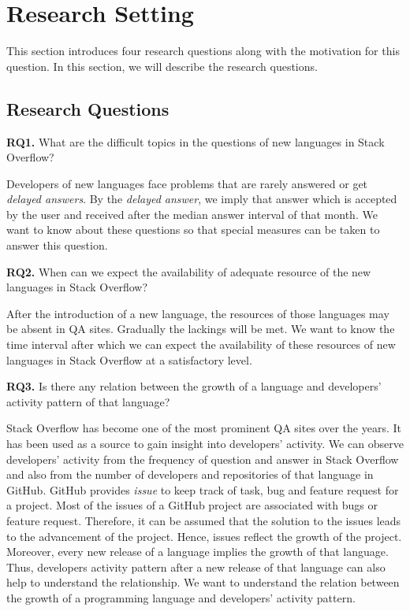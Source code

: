 \section{Research Setting}
\label{sec:Research Setting}
This section introduces four research questions along with the motivation for this question. In this section, we will describe the research questions.

\subsection{Research Questions}
\noindent \textbf{RQ1.} What are the difficult topics in the questions of new languages in Stack Overflow?

\indent  Developers of new languages face problems that are rarely answered or get \emph{delayed answers}. By the \emph{delayed answer}, we imply that answer which is accepted by the user and received after the median answer interval of that month. We want to know about these questions so that special measures can be taken to answer this question.

\noindent  \textbf{RQ2.} When can we expect the availability of adequate resource of the new languages in Stack Overflow?

\indent After the introduction of a new language, the resources of those languages may be absent in QA sites. Gradually the lackings will be met. We want to know the time interval after which we can expect the availability of these resources of new languages in Stack Overflow at a satisfactory level.

\noindent  \textbf{RQ3.} Is there any relation between the growth of a language and developers' activity pattern of that language?

\indent Stack Overflow has become one of the most prominent QA sites over the years. It has been used as a source to gain insight into developers' activity\citep{Ahmed2017}. We can observe developers' activity from the frequency of question and answer in Stack Overflow and also from the number of developers and repositories of that language in GitHub. GitHub provides \emph{issue}\citep{GithubIssue} to keep track of task, bug and feature request for a project. Most of the issues of a GitHub project are associated with bugs or feature request\citep{Bissyande2013}. Therefore, it can be assumed that the solution to the issues leads to the advancement of the project. Hence, issues reflect the growth of the project. Moreover, every new release of a language implies the growth of that language. Thus, developers activity pattern after a new release of that language can also help to understand the relationship. We want to understand the relation between the growth of a programming language and developers' activity pattern.

